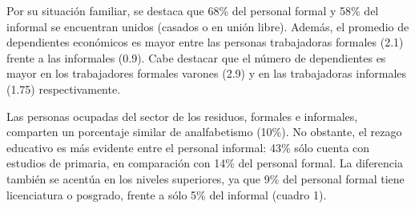 \documentclass[
  spanish,
  11.5pt,
  170mm x 240mmpaper,
]{scrbook}
\begin{document}
Por su situación familiar, se destaca que 68\% del personal formal y
58\% del informal se encuentran unidos (casados o en unión libre).
Además, el promedio de dependientes económicos es mayor entre las
personas trabajadoras formales (2.1) frente a las informales (0.9). Cabe
destacar que el número de dependientes es mayor en los trabajadores
formales varones (2.9) y en las trabajadoras informales (1.75)
respectivamente.

Las personas ocupadas del sector de los residuos, formales e informales,
comparten un porcentaje similar de analfabetismo (10\%). No obstante, el
rezago educativo es más evidente entre el personal informal: 43\% sólo
cuenta con estudios de primaria, en comparación con 14\% del personal
formal. La diferencia también se acentúa en los niveles superiores, ya
que 9\% del personal formal tiene licenciatura o posgrado, frente a sólo
5\% del informal (cuadro 1).

\begingroup
\scriptsize
\end{document}

